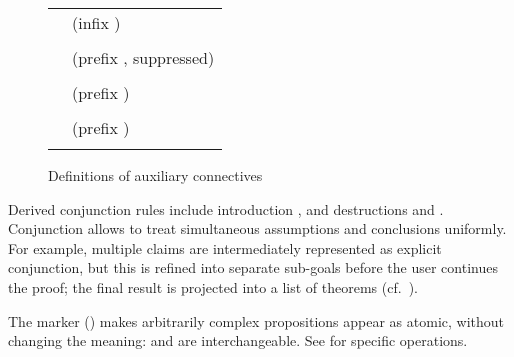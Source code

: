 \begin{isabellebody}
\begin{isamarkuptext}
  \begin{figure}[htb]
  \begin{center}
  \begin{tabular}{ll}
  \isa{conjunction\ {\isacharcolon}{\isacharcolon}\ prop\ {\isasymRightarrow}\ prop\ {\isasymRightarrow}\ prop} & (infix \isa{{\isacharampersand}}) \\
  \isa{{\isasymturnstile}\ A\ {\isacharampersand}\ B\ {\isasymequiv}\ {\isacharparenleft}{\isasymAnd}C{\isachardot}\ {\isacharparenleft}A\ {\isasymLongrightarrow}\ B\ {\isasymLongrightarrow}\ C{\isacharparenright}\ {\isasymLongrightarrow}\ C{\isacharparenright}} \\[1ex]
  \isa{prop\ {\isacharcolon}{\isacharcolon}\ prop\ {\isasymRightarrow}\ prop} & (prefix \isa{{\isacharhash}}, suppressed) \\
  \isa{{\isacharhash}A\ {\isasymequiv}\ A} \\[1ex]
  \isa{term\ {\isacharcolon}{\isacharcolon}\ {\isasymalpha}\ {\isasymRightarrow}\ prop} & (prefix \isa{TERM}) \\
  \isa{term\ x\ {\isasymequiv}\ {\isacharparenleft}{\isasymAnd}A{\isachardot}\ A\ {\isasymLongrightarrow}\ A{\isacharparenright}} \\[1ex]
  \isa{TYPE\ {\isacharcolon}{\isacharcolon}\ {\isasymalpha}\ itself} & (prefix \isa{TYPE}) \\
  \isa{{\isacharparenleft}unspecified{\isacharparenright}} \\
  \end{tabular}
  \caption{Definitions of auxiliary connectives}\label{fig:pure-aux}
  \end{center}
  \end{figure}

  Derived conjunction rules include introduction , and destructions  and .
  Conjunction allows to treat simultaneous assumptions and conclusions
  uniformly.  For example, multiple claims are intermediately
  represented as explicit conjunction, but this is refined into
  separate sub-goals before the user continues the proof; the final
  result is projected into a list of theorems (cf.\
  ).

  The  marker (\isa{{\isacharhash}}) makes arbitrarily complex
  propositions appear as atomic, without changing the meaning:  and  are interchangeable.  See
  \secref{sec:tactical-goals} for specific operations.


\end{isamarkuptext}
\end{isabellebody}
